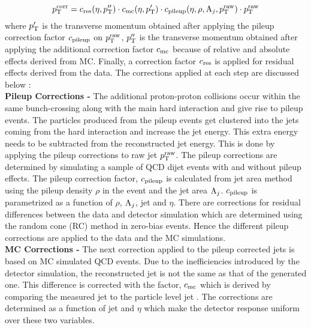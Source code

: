 \begin{equation}
p^{\rm corr}_{\rm T} = c_{\rm res}(\eta,p''_{\rm T})\cdot c_{\rm mc}(\eta,p'_{\rm T})\cdot c_{\rm pileup}(\eta,\rho,{\rm A}_{j},p^{\rm raw}_{\rm T})\cdot p^{\rm raw}_{\rm T}
\end{equation}
where $p'_{\rm T}$ is the transverse momentum obtained after applying the pileup correction factor $c_{\rm pileup}$ on $p^{\rm raw}_{\rm T}$, $p''_{\rm T}$ is the transverse momentum obtained after applying the additional correction factor $c_{\rm mc}$ because of relative and absolute effects derived from MC. Finally, a correction factor $c_{\rm res}$ is applied for residual effects derived from the data. The corrections applied at each step are discussed below : \\\newline
{\bf Pileup Corrections -} The additional proton-proton collisions occur within the same bunch-crossing along with the main hard interaction and give rise to pileup events. The particles produced from the pileup events get clustered into the jets coming from the hard interaction and increase the jet energy. This extra energy needs to be subtracted from the reconstructed jet energy. This is done by applying the pileup corrections to raw jet $p^{\rm raw}_{\rm T}$. The pileup corrections are determined by simulating a sample of QCD dijet events with and without pileup effects. The pileup correction factor, $c_{\rm pileup}$ is calculated from jet area method using the pileup density $\rho$ in the event and the jet area ${\rm A}_{j}$. $c_{\rm pileup}$ is parametrized as a function of $\rho$, ${\rm A}_{j}$, jet \pt and $\eta$. There are corrections for residual differences between the data and detector simulation which are determined using the random cone (RC) method in zero-bias events. Hence the different pileup corrections are applied to the data and the MC simulations. \\ \newline
{\bf MC Corrections -} The next correction applied to the pileup corrected jets is based on MC simulated QCD events. Due to the inefficiencies introduced by the detector simulation, the reconstructed jet \pt is not the same as that of the generated one. This difference is corrected with the factor, $c_{\rm mc}$ which is derived by comparing the measured jet \pt to the particle level jet \pt. The corrections are determined as a function of jet \pt and $\eta$ which make the detector response uniform over these two variables. \\ \newline
